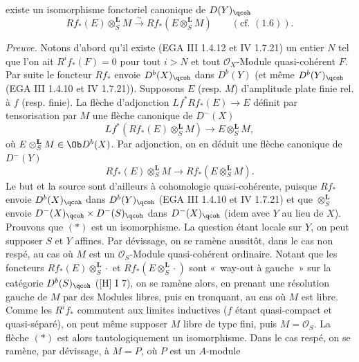existe un isomorphisme fonctoriel canonique de \(D(Y)_{\qcoh}\)
\[
 Rf_*(E)\otimes_S^{\mathbf L}M
 \xrightarrow{\sim}
 Rf_*(E\otimes_S^{\mathbf L}M)\qquad(\text{cf. }(1.6)).
\]

\emph{Preuve.} Notons d'abord qu'il existe (EGA III 1.4.12 et IV 1.7.21) un entier \(N\) tel que l'on ait \(R^if_*(F)=0\) pour tout \(i>N\) et tout \(\mathcal O_X\)-Module quasi-cohérent \(F\). Par suite le foncteur \(Rf_*\) envoie \(D^b(X)_{\qcoh}\) dans \(D^b(Y)\) (et même \(D^b(Y)_{\qcoh}\) (EGA III 1.4.10 et IV 1.7.21)). Supposons \(E\) (resp. \(M\)) d'amplitude plate finie rel. à \(f\) (resp. finie). La flèche d'adjonction \(Lf^*Rf_*(E)\longrightarrow E\) définit par tensorisation par \(M\) une flèche canonique de \(D^-(X)\)
\[
 Lf^*(Rf_*(E)\otimes_S^{\mathbf L}M)
 \longrightarrow E\otimes_S^{\mathbf L}M,
\]
où \(E\otimes_S^{\mathbf L}M\in\Ob D^b(X)\). Par adjonction, on en déduit une flèche canonique de \(D^-(Y)\)
\[
 Rf_*(E)\otimes_S^{\mathbf L}M
 \longrightarrow Rf_*(E\otimes_S^{\mathbf L}M).\tag{*}
\]
Le but et la source sont d'ailleurs à cohomologie quasi-cohérente, puisque \(Rf_*\) envoie \(D^b(X)_{\qcoh}\) dans \(D^b(Y)_{\qcoh}\) (EGA III 1.4.10 et IV 1.7.21) et que \(\otimes_S^{\mathbf L}\) envoie \(D^-(X)_{\qcoh}\times D^-(S)_{\qcoh}\) dans \(D^-(X)_{\qcoh}\) (idem avec \(Y\) au lieu de \(X\)). Prouvons que \((*)\) est un isomorphisme. La question étant locale sur \(Y\), on peut supposer \(S\) et \(Y\) affines. Par dévissage, on se ramène aussitôt, dans le cas non respé, au cas où \(M\) est un \(\mathcal O_S\)-Module quasi-cohérent ordinaire. Notant que les foncteurs \(Rf_*(E)\otimes_S^{\mathbf L}\cdot\) et \(Rf_*(E\otimes_S^{\mathbf L}\cdot)\) sont «~way-out à gauche~» sur la catégorie \(D^b(S)_{\qcoh}\) ([H] I 7), on se ramène alors, en prenant une résolution gauche de \(M\) par des Modules libres, puis en tronquant, au cas où \(M\) est libre. Comme les \(R^if_*\) commutent aux limites inductives (\(f\) étant quasi-compact et quasi-séparé), on peut même supposer \(M\) libre de type fini, puis \(M=\mathcal O_S\). La flèche \((*)\) est alors tautologiquement un isomorphisme. Dans le cas respé, on se ramène, par dévissage, à \(M=P\), où \(P\) est un \(A\)-module
